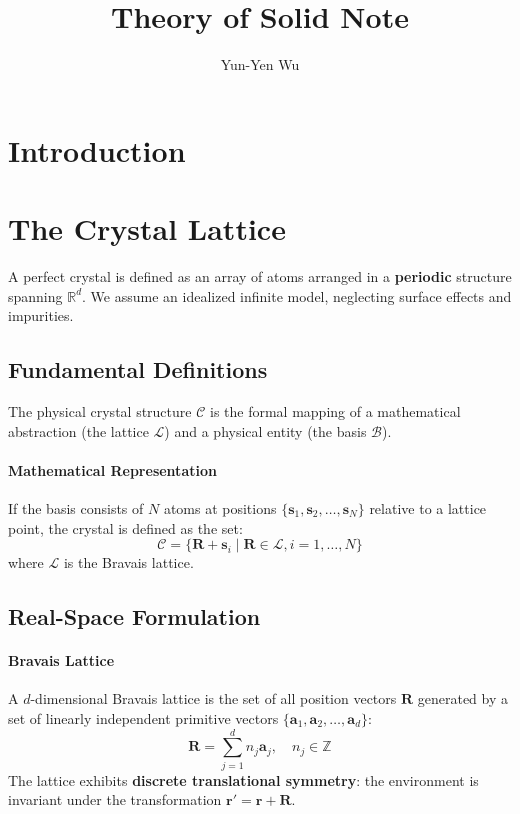\documentclass[10pt, a4paper]{article}
\title{Theory of Solid Note}
\author{Yun-Yen Wu}
\date{}
\begin{document}
\maketitle

\tableofcontents

\newpage 

\setcounter{page}{1} 

\section{Introduction}

\section{The Crystal Lattice}

A perfect crystal is defined as an array of atoms arranged in a \textbf{periodic} structure spanning $\mathbb{R}^d$. We assume an idealized infinite model, neglecting surface effects and impurities.

\subsection{Fundamental Definitions}
The physical crystal structure $\mathcal{C}$ is the formal mapping of a mathematical abstraction (the lattice $\mathcal{L}$) and a physical entity (the basis $\mathcal{B}$). 

\paragraph{Mathematical Representation}
If the basis consists of $N$ atoms at positions $\{\mathbf{s}_1, \mathbf{s}_2, \dots, \mathbf{s}_N\}$ relative to a lattice point, the crystal is defined as the set:
\begin{equation}
    \mathcal{C} = \{ \mathbf{R} + \mathbf{s}_i \mid \mathbf{R} \in \mathcal{L}, i = 1, \dots, N \}
\end{equation}
where $\mathcal{L}$ is the Bravais lattice.

\subsection{Real-Space Formulation}

\paragraph{Bravais Lattice} 
A $d$-dimensional Bravais lattice is the set of all position vectors $\mathbf{R}$ generated by a set of linearly independent primitive vectors $\{\mathbf{a}_1, \mathbf{a}_2, \dots, \mathbf{a}_d\}$:
\begin{equation}
    \mathbf{R} = \sum^d_{j=1} n_j \mathbf{a}_j, \quad n_j \in \mathbb{Z}
\end{equation}
The lattice exhibits \textbf{discrete translational symmetry}: the environment is invariant under the transformation $\mathbf{r}' = \mathbf{r} + \mathbf{R}$.
\end{document}
